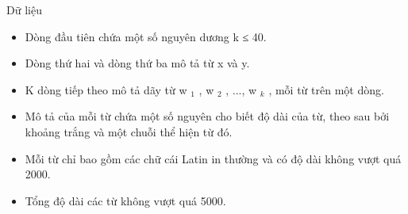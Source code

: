 Dữ liệu
\begin{itemize}
	\item     Dòng đầu tiên chứa một số nguyên dương k ≤ 40.   
	\item     Dòng thứ hai và dòng thứ ba mô tả từ x và y.   
	\item     K dòng tiếp theo mô tả dãy từ w    $_     1    $    , w    $_     2    $    , ..., w    $_     k    $    , mỗi từ trên một dòng.   
	\item     Mô tả của mỗi từ chứa một số nguyên cho biết độ dài của từ, theo sau bởi khoảng trắng và một chuỗi thể hiện từ đó.   
	\item     Mỗi từ chỉ bao gồm các chữ cái Latin in thường và có độ dài không vượt quá 2000.   
	\item     Tổng độ dài các từ không vượt quá 5000.   
\end{itemize}